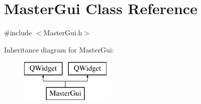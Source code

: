\hypertarget{class_master_gui}{\section{Master\-Gui Class Reference}
\label{class_master_gui}
}


{\ttfamily \#include $<$Master\-Gui.\-h$>$}

Inheritance diagram for Master\-Gui\-:\begin{figure}[H]
\begin{center}
\leavevmode
\includegraphics[height=2.000000cm]{class_master_gui}
\end{center}
\end{figure}
